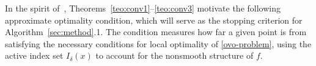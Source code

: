 \documentclass[11pt]{article}
\newcommand{\R}{\mathbb{R}}
\newcommand{\xkjtrial}{x^{k,j}_{\mathrm{trial}}}
\newcommand{\simplex}{\textstyle\sum}
\newtheorem{theorem}{Theorem}[section]
\newtheorem{assumption}{Assumption}
\begin{document}



In the spirit of~\cite{alvarezovo}, Theorems~\ref{teo:conv1}--\ref{teo:conv3} 
motivate the following approximate optimality condition, which 
will serve as the stopping criterion for Algorithm~\ref{sec:method}.1. 
The condition measures how far a given point is from satisfying the 
necessary conditions for local optimality of \eqref{ovo-problem}, 
using the active index set $I_\delta(x)$ to account for the 
nonsmooth structure of $f$.
\end{document}
